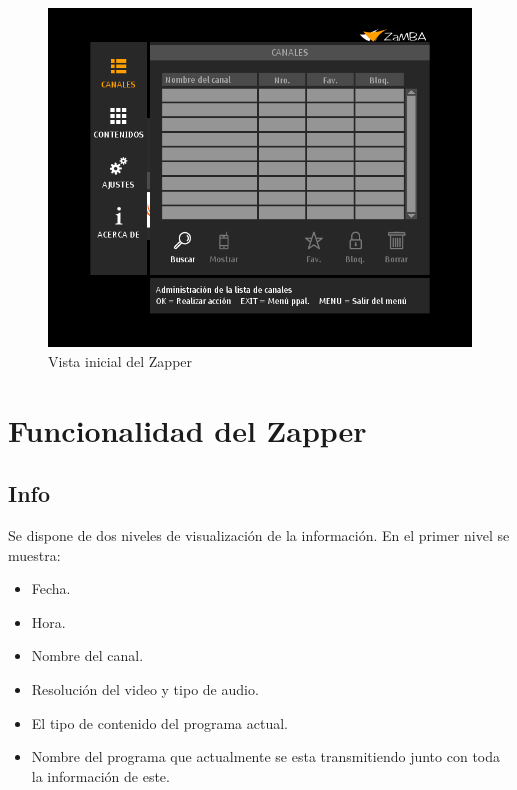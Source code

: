 \documentclass{article}
\begin{document}
\vspace{0.5cm}
\begin{figure}[h]
 \centerline{\includegraphics[scale=0.50,keepaspectratio=true]{inicio}}
 \caption{Vista inicial del Zapper}
\end{figure}
\pagebreak

\section{Funcionalidad del Zapper}

\subsection{Info}
Se dispone de dos niveles de visualización de la información. 
En el primer nivel se muestra:
	\begin{itemize}
		\item Fecha.
		\item Hora.
		\item Nombre del canal.
		\item Resolución del video y tipo de audio.
		\item El tipo de contenido del programa actual.
		\item Nombre del programa que actualmente se esta transmitiendo junto con toda la información de este.
	\end{itemize}
	
\end{document}
